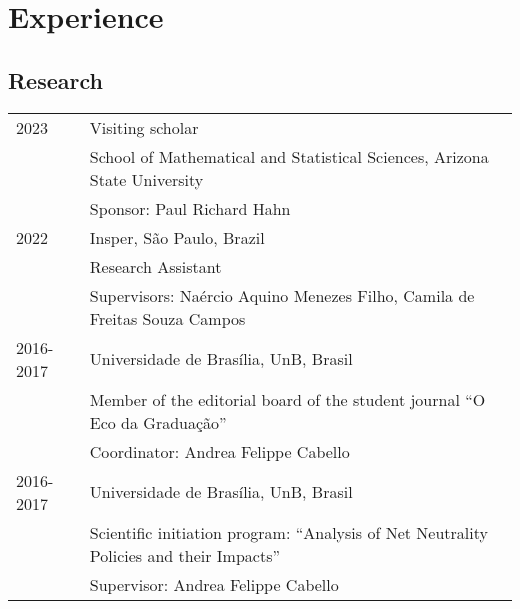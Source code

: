 \documentclass[10pt]{article}
\begin{document}
\section*{Experience}
\label{sec:orgf63daba}
\subsection*{Research}
\label{sec:org42335b9}
\begin{footnotesize}
  \begin{tabular}{ll}
    2023      & Visiting scholar\\
	      & School of Mathematical and Statistical Sciences, Arizona State University\\
	      & Sponsor: Paul Richard Hahn\\
    2022      & Insper, São Paulo, Brazil\\
	      & Research Assistant\\
	      & Supervisors: Naércio Aquino Menezes Filho, Camila de Freitas Souza Campos\\
    2016-2017 & Universidade de Brasília, UnB, Brasil\\
	      & Member of the editorial board of the student journal ``O Eco da Graduação''\\
	      & Coordinator: Andrea Felippe Cabello\\
    2016-2017 & Universidade de Brasília, UnB, Brasil\\
	      & Scientific initiation program: ``Analysis of Net Neutrality Policies and their Impacts''\\
	      & Supervisor: Andrea Felippe Cabello
  \end{tabular}
\end{footnotesize}
\end{document}
